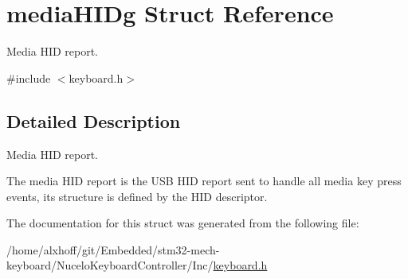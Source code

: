 \hypertarget{structmediaHIDg}{}\section{media\+H\+I\+Dg Struct Reference}
\label{structmediaHIDg}


Media H\+ID report.  




{\ttfamily \#include $<$keyboard.\+h$>$}



\subsection{Detailed Description}
Media H\+ID report. 

The media H\+ID report is the U\+SB H\+ID report sent to handle all media key press events, its structure is defined by the H\+ID descriptor. 

The documentation for this struct was generated from the following file\+:\begin{DoxyCompactItemize}
\item 
/home/alxhoff/git/\+Embedded/stm32-\/mech-\/keyboard/\+Nucelo\+Keyboard\+Controller/\+Inc/\hyperlink{keyboard_8h}{keyboard.\+h}\end{DoxyCompactItemize}
